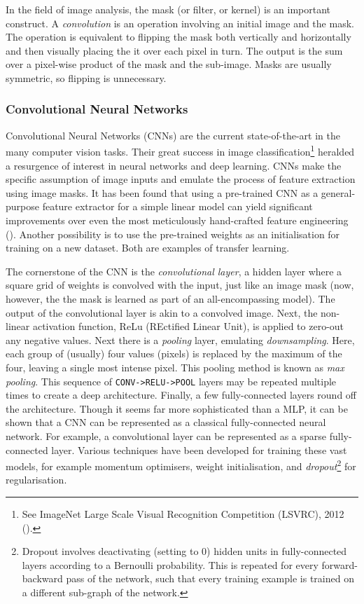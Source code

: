 \documentclass[11pt]{amsart}
\begin{document}
In the field of image analysis, the mask (or filter, or kernel) is an important construct. A \emph{convolution} is an operation involving an initial image and the mask. The operation is equivalent to flipping the mask both vertically and horizontally and then visually placing the it over each pixel in turn. The output is the sum over a pixel-wise product of the mask and the sub-image. Masks are usually symmetric, so flipping is unnecessary.

\subsubsection{Convolutional Neural Networks}

Convolutional Neural Networks (CNNs) are the current state-of-the-art in the many computer vision tasks. Their great success in image classification\footnote{See ImageNet Large Scale Visual Recognition Competition (LSVRC), 2012 (\cite{krizhevsky2012imagenet}).} heralded a resurgence of interest in neural networks and deep learning. CNNs make the specific assumption of image inputs and emulate the process of feature extraction using image masks. It has been found that using a pre-trained CNN as a general-purpose feature extractor for a simple linear model can yield significant improvements over even the most meticulously hand-crafted feature engineering (\cite{sharif2014cnn}). Another possibility is to use the pre-trained weights as an initialisation for training on a new dataset. Both are examples of transfer learning.

The cornerstone of the CNN is the \emph{convolutional layer}, a hidden layer where a square grid of weights is convolved with the input, just like an image mask (now, however, the the mask is learned as part of an all-encompassing model). The output of the convolutional layer is akin to a convolved image. Next, the non-linear activation function, ReLu (REctified Linear Unit), is applied to zero-out any negative values. Next there is a \emph{pooling} layer, emulating \emph{downsampling}. Here, each group of (usually) four values (pixels) is replaced by the maximum of the four, leaving a single most intense pixel. This pooling method is known as \emph{max pooling}. This sequence of \texttt{CONV->RELU->POOL} layers may be repeated multiple times to create a deep architecture. Finally, a few fully-connected layers round off the architecture. Though it seems far more sophisticated than a MLP, it can be shown that a CNN can be represented as a classical fully-connected neural network. For example, a convolutional layer can be represented as a sparse fully-connected layer. Various techniques have been developed for training these vast models, for example momentum optimisers, weight initialisation, and \emph{dropout}\footnote{Dropout involves deactivating (setting to $0$) hidden units in fully-connected layers according to a Bernoulli probability. This is repeated for every forward-backward pass of the network, such that every training example is trained on a different sub-graph of the network.} for regularisation.
\end{document}
